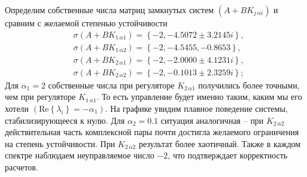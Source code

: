 \documentclass[a4paper, 12pt]{article}
\begin{document}
    Определим собственные числа матриц замкнутых систем $\left( A+BK_{j\,\alpha i} \right)$
    и сравним с желаемой степенью устойчивости
    \begin{align*}
    &\sigma\left( A+BK_{1\,\alpha1} \right)=\left\{ -2, -4.5072\pm3.2145i \right\},\\
    &\sigma\left( A+BK_{1\,\alpha2} \right)=\left\{ -2,-4.5455,-0.8653 \right\},\\
    &\sigma\left( A+BK_{2\,\alpha1} \right)=\left\{ -2, -2.0000\pm4.1231i \right\},\\
    &\sigma\left( A+BK_{2\,\alpha2} \right)=\left\{ -2,-0.1013\pm2.3259i \right\};
    \end{align*}
    Для $\alpha_1=2$ собственные числа при регуляторе $K_{2\,\alpha1}$ получились более точными,
    чем при регуляторе $K_{1\,\alpha1}$. То есть управление будет именно таким, каким мы его хотели $\left( \text{Re}\left\{ \lambda_i \right\}=-\alpha_1 \right)$.
    На графике увидим плавное поведение системы, стабилизирующееся к нулю. Для $\alpha_2=0.1$ ситуация аналогичная
    -- при $K_{2\,\alpha2}$ действительная часть комплексной пары почти достигла желаемого ограничения на степень устойчивости.
    При $K_{2\,\alpha2}$ результат более хаотичный. Также в каждом спектре наблюдаем неуправляемое число $-2$, что подтверждает
    корректность расчетов.
\end{document}

